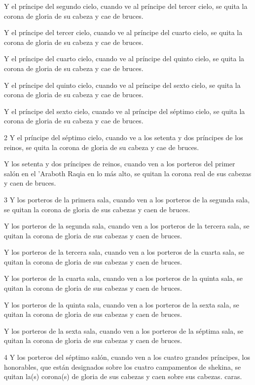 Y el príncipe del segundo cielo, cuando ve al príncipe del tercer cielo, se quita la corona de gloria de su cabeza y cae de bruces.

Y el príncipe del tercer cielo, cuando ve al príncipe del cuarto cielo, se quita la corona de gloria de su cabeza y cae de bruces.

Y el príncipe del cuarto cielo, cuando ve al príncipe del quinto cielo, se quita la corona de gloria de su cabeza y cae de bruces.

Y el príncipe del quinto cielo, cuando ve al príncipe del sexto cielo, se quita la corona de gloria de su cabeza y cae de bruces.

Y el príncipe del sexto cielo, cuando ve al príncipe del séptimo cielo, se quita la corona de gloria de su cabeza y cae de bruces.

\par 2 Y el príncipe del séptimo cielo, cuando ve a los setenta y dos príncipes de los reinos, se quita la corona de gloria de su cabeza y cae de bruces.

\par Y los setenta y dos príncipes de reinos, cuando ven a los porteros del primer salón en el 'Araboth Raqia en lo más alto, se quitan la corona real de sus cabezas y caen de bruces.

\par 3 Y los porteros de la primera sala, cuando ven a los porteros de la segunda sala, se quitan la corona de gloria de sus cabezas y caen de bruces.

Y los porteros de la segunda sala, cuando ven a los porteros de la tercera sala, se quitan la corona de gloria de sus cabezas y caen de bruces.

Y los porteros de la tercera sala, cuando ven a los porteros de la cuarta sala, se quitan la corona de gloria de sus cabezas y caen de bruces.

Y los porteros de la cuarta sala, cuando ven a los porteros de la quinta sala, se quitan la corona de gloria de sus cabezas y caen de bruces.

Y los porteros de la quinta sala, cuando ven a los porteros de la sexta sala, se quitan la corona de gloria de sus cabezas y caen de bruces.

Y los porteros de la sexta sala, cuando ven a los porteros de la séptima sala, se quitan la corona de gloria de sus cabezas y caen de bruces.

\par 4 Y los porteros del séptimo salón, cuando ven a los cuatro grandes príncipes, los honorables, que están designados sobre los cuatro campamentos de shekina, se quitan la(s) corona(s) de gloria de sus cabezas y caen sobre sus cabezas. caras.

